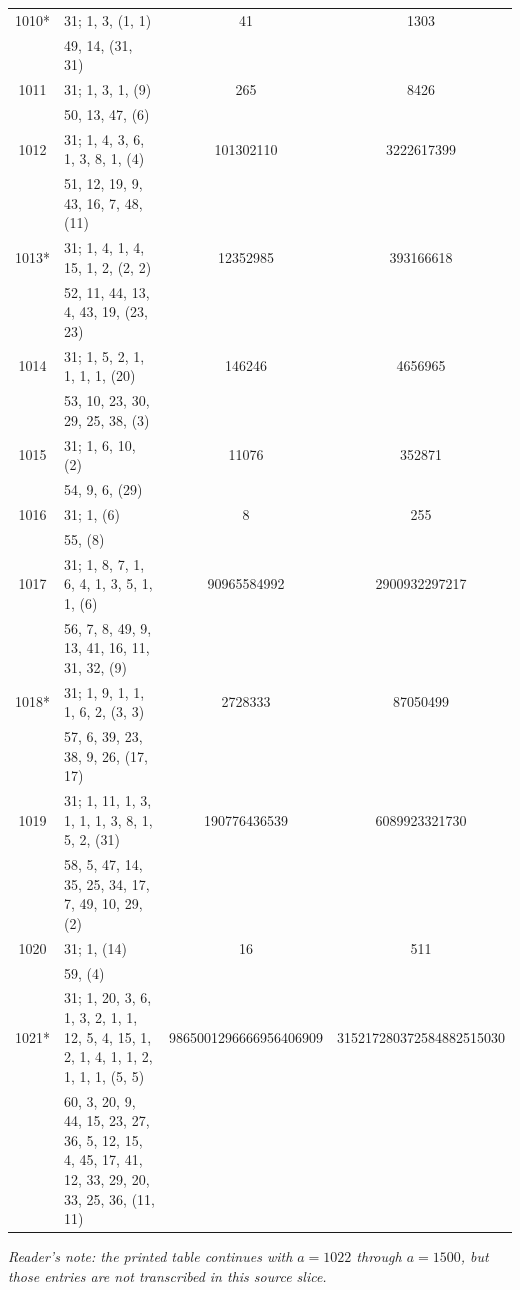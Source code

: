 \documentclass[12pt,a4paper]{article}
\begin{document}
\begin{longtable}{|c|l|c|c|}
\hline
1010* & 31; 1, 3, (1, 1) & 41 & 1303 \\
     & 49, 14, (31, 31) & & \\
\hline
1011 & 31; 1, 3, 1, (9) & 265 & 8426 \\
     & 50, 13, 47, (6) & & \\
\hline
1012 & 31; 1, 4, 3, 6, 1, 3, 8, 1, (4) & 101302110 & 3222617399 \\
     & 51, 12, 19, 9, 43, 16, 7, 48, (11) & & \\
\hline
1013* & 31; 1, 4, 1, 4, 15, 1, 2, (2, 2) & 12352985 & 393166618 \\
     & 52, 11, 44, 13, 4, 43, 19, (23, 23) & & \\
\hline
1014 & 31; 1, 5, 2, 1, 1, 1, 1, (20) & 146246 & 4656965 \\
     & 53, 10, 23, 30, 29, 25, 38, (3) & & \\
\hline
1015 & 31; 1, 6, 10, (2) & 11076 & 352871 \\
     & 54, 9, 6, (29) & & \\
\hline
1016 & 31; 1, (6) & 8 & 255 \\
     & 55, (8) & & \\
\hline
1017 & 31; 1, 8, 7, 1, 6, 4, 1, 3, 5, 1, 1, (6) & 90965584992 & 2900932297217 \\
     & 56, 7, 8, 49, 9, 13, 41, 16, 11, 31, 32, (9) & & \\
\hline
1018* & 31; 1, 9, 1, 1, 1, 6, 2, (3, 3) & 2728333 & 87050499 \\
     & 57, 6, 39, 23, 38, 9, 26, (17, 17) & & \\
\hline
1019 & 31; 1, 11, 1, 3, 1, 1, 1, 3, 8, 1, 5, 2, (31) & 190776436539 & 6089923321730 \\
     & 58, 5, 47, 14, 35, 25, 34, 17, 7, 49, 10, 29, (2) & & \\
\hline
1020 & 31; 1, (14) & 16 & 511 \\
     & 59, (4) & & \\
\hline
1021* & 31; 1, 20, 3, 6, 1, 3, 2, 1, 1, 12, 5, 4, 15, 1, 2, 1, 4, 1, 1, 2, 1, 1, 1, (5, 5) & 9865001296666956406909 & 315217280372584882515030 \\
     & 60, 3, 20, 9, 44, 15, 23, 27, 36, 5, 12, 15, 4, 45, 17, 41, 12, 33, 29, 20, 33, 25, 36, (11, 11) & & \\
\hline
\end{longtable}
\normalsize

\begin{center}
\footnotesize\itshape
Reader's note: the printed table continues with $a=1022$ through $a=1500$, but those
entries are not transcribed in this source slice.
\end{center}
\end{document}
